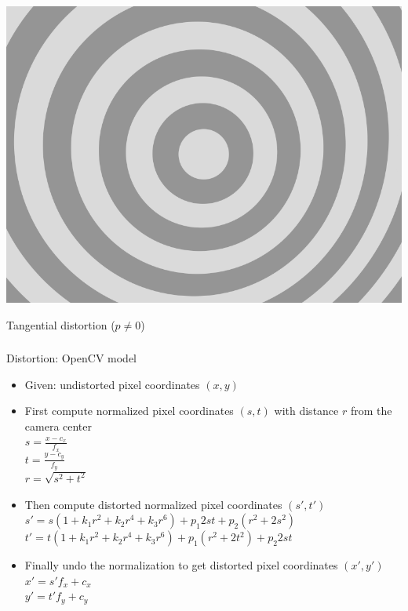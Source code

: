 \documentclass[utf8,stillsansserifmath,fleqn,t]{beamer}
\begin{document}
\begin{frame}
\begin{minipage}{.49\textwidth}
\centerline{\includegraphics[width=.6\textwidth]{./fig/distortion-circle-tangential.png}}
\centerline{Tangential distortion ($p\neq0$)}
\end{minipage}
\end{frame}

\begin{frame}
\frametitle{\insertsection}
Distortion: OpenCV model
\begin{itemize}
\item Given: undistorted pixel coordinates $(x,y)$
\item First compute normalized pixel coordinates $(s,t)$ with distance $r$ from the
camera center\\
$s = \frac{x-c_x}{f_x}$\\
$t = \frac{y-c_y}{f_y}$\\
$r = \sqrt{s^2+t^2}$
\item Then compute distorted normalized pixel coordinates $(s',t')$\\
$s'=s (1 + k_1 r^2 + k_2 r^4 + k_3 r^6) + p_1 2st + p_2 (r^2+2s^2)$\\
$t'=t (1 + k_1 r^2 + k_2 r^4 + k_3 r^6) + p_1 (r^2+2t^2) + p_2 2st$
\item Finally undo the normalization to get distorted pixel coordinates $(x',y')$\\
$x' = s' f_x + c_x$\\
$y' = t' f_y + c_y$
\end{itemize}
\end{frame}
\end{document}
